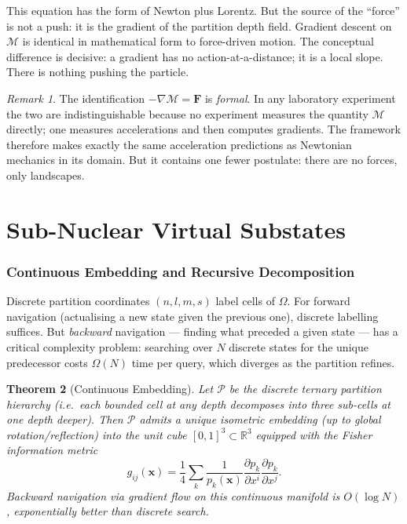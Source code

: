 \documentclass[11pt,a4paper]{article}
\newtheorem{theorem}{Theorem}[section]
\theoremstyle{definition}
\theoremstyle{remark}
\newtheorem{remark}[theorem]{Remark}
\newcommand{\Depth}{\mathcal{M}}
\newcommand{\Real}{\mathbb{R}}
\begin{document}
This equation has the form of Newton plus Lorentz. But the source of the ``force'' is not a push: it is the gradient of the partition depth field. Gradient descent on $\Depth$ is identical in mathematical form to force-driven motion. The conceptual difference is decisive: a gradient has no action-at-a-distance; it is a local slope. There is nothing pushing the particle.

\begin{remark}
The identification $-\nabla\Depth = \mathbf{F}$ is \emph{formal}. In any laboratory experiment the two are indistinguishable because no experiment measures the quantity $\Depth$ directly; one measures accelerations and then computes gradients. The framework therefore makes exactly the same acceleration predictions as Newtonian mechanics in its domain. But it contains one fewer postulate: there are no forces, only landscapes.
\end{remark}

\part{Sub-Nuclear Virtual Substates}

\section{Continuous Embedding and Recursive Decomposition}
\label{sec:embed}

Discrete partition coordinates $(n,l,m,s)$ label cells of $\Omega$. For forward navigation (actualising a new state given the previous one), discrete labelling suffices. But \emph{backward} navigation --- finding what preceded a given state --- has a critical complexity problem: searching over $N$ discrete states for the unique predecessor costs $\Omega(N)$ time per query, which diverges as the partition refines.

\begin{theorem}[Continuous Embedding]
\label{thm:embed}
Let $\mathcal{P}$ be the discrete ternary partition hierarchy (i.e.\ each bounded cell at any depth decomposes into three sub-cells at one depth deeper). Then $\mathcal{P}$ admits a unique isometric embedding (up to global rotation/reflection) into the unit cube $[0,1]^3 \subset \Real^3$ equipped with the Fisher information metric \citep{fisher1925}
\[
g_{ij}(\mathbf{x}) = \frac{1}{4}\sum_{k}\frac{1}{p_k(\mathbf{x})}\frac{\partial p_k}{\partial x^i}\frac{\partial p_k}{\partial x^j}.
\]
Backward navigation via gradient flow on this continuous manifold is $O(\log N)$, exponentially better than discrete search.
\end{theorem}
\end{document}
